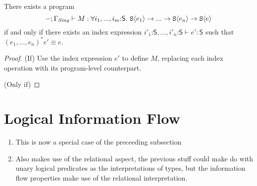 \begin{theorem}
  There exists a program
  \begin{displaymath}
    -; \Gamma_{\mathit{Sing}} \vdash M : \forall i_1,...,i_m\mathord:\mathsf{S}.\ \textup{\texttt{S}}\langle e_1 \rangle \to ... \to \textup{\texttt{S}}\langle e_n \rangle \to \textup{\texttt{S}}\langle e \rangle
  \end{displaymath}
  if and only if there exists an index expression
  $i'_1\mathord:\mathsf{S}, ..., i'_n\mathord:\mathsf{S} \vdash e' :
  \mathsf{S}$ such that $(e_1,...,e_n)^*e' \equiv e$.
\end{theorem}

\begin{proof}
  (If) Use the index expression $e'$ to define $M$, replacing each
  index operation with its program-level counterpart.

  (Only if) 
\end{proof}



\section{Logical Information Flow}
\label{sec:information-flow}

\begin{enumerate}
\item This is now a special case of the preceeding subsection
\item Also makes use of the relational aspect, the previous stuff
  could make do with unary logical predicates as the interpretations
  of types, but the information flow properties make use of the
  relational interpretation.
\end{enumerate}

